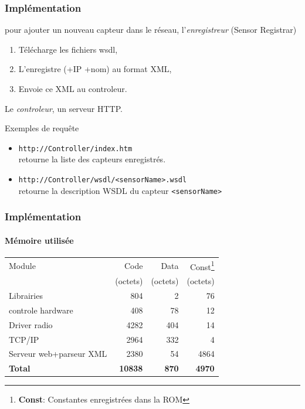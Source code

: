 \begin{frame}
 \frametitle{Implémentation}
 pour ajouter un nouveau capteur dans le réseau, l'\textit{enregistreur} (Sensor Registrar)
 \begin{enumerate}
  \item Télécharge les fichiers wsdl,
  \item L'enregistre (+IP +nom) au format XML,
  \item Envoie ce XML au controleur.
 \end{enumerate}
 \vspace{4mm}
 Le \textit{controleur}, un serveur HTTP.
 \begin{exampleblock}{Exemples de requête}
 \begin{itemize}
  \item \texttt{http://Controller/index.htm}\\retourne la liste des capteurs enregistrés.
  \item \texttt{http://Controller/wsdl/<sensorName>.wsdl}\\retourne la description WSDL du capteur \texttt{<sensorName>}
 \end{itemize} 
 \end{exampleblock}
\end{frame}


\newcommand{\unite}{(octets)}
\begin{frame}%
 \frametitle{Implémentation}
 \framesubtitle{Mémoire utilisée}
 \begin{center}
 \begin{tabular}{|l|r|r|r|}
  \hline
  Module & Code & Data & Const\footnote{\textbf{Const}: Constantes enregistrées dans la ROM}\\
  ~ & \unite & \unite & \unite \\
  \hline
  Librairies & 804 & 2 & 76\\
  controle hardware & 408 & 78 & 12\\
  Driver radio & 4282 & 404 & 14\\
  TCP/IP & 2964 & 332 & 4\\
  Serveur web+parseur XML & 2380 & 54 & 4864\\
  \hline
  \textbf{Total} & \textbf{10838} & \textbf{870} & \textbf{4970}\\
  \hline
 \end{tabular}
 \end{center}
\end{frame}

 
 
